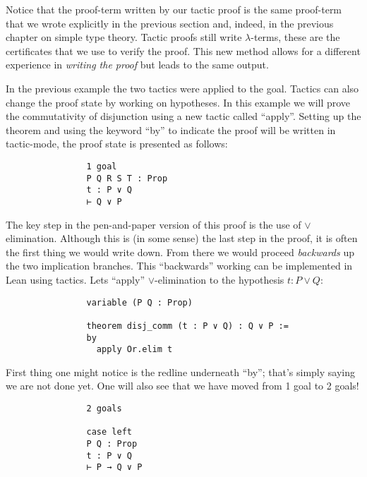 \documentclass{book}
\begin{document}
    Notice that the proof-term written by our tactic proof is the same proof-term that we wrote explicitly in the previous section and, indeed, in the previous chapter on simple type theory. Tactic proofs still write $\lambda$-terms, these are the certificates that we use to verify the proof. This new method allows for a different experience in \emph{writing the proof} but leads to the same output. 

    \newpage
    \begin{eg}
        In the previous example the two tactics were applied to the goal. Tactics can also change the proof state by working on hypotheses. In this example we will prove the commutativity of disjunction using a new tactic called ``apply''. Setting up the theorem and using the keyword ``by'' to indicate the proof will be written in tactic-mode, the proof state is presented as follows:
        \begin{center}
            \begin{lstlisting}
                1 goal
                P Q R S T : Prop
                t : P ∨ Q
                ⊢ Q ∨ P
            \end{lstlisting}            
        \end{center}
        The key step in the pen-and-paper version of this proof is the use of $\lor$ elimination. Although this is (in some sense) the last step in the proof, it is often the first thing we would write down. From there we would proceed \emph{backwards} up the two implication branches. This ``backwards'' working can be implemented in Lean using tactics. Lets ``apply'' $\lor$-elimination to the hypothesis $t : P \lor Q$: 
        \begin{center}
            \begin{lstlisting}
                variable (P Q : Prop)
                
                theorem disj_comm (t : P ∨ Q) : Q ∨ P :=
                by
                  apply Or.elim t
            \end{lstlisting}            
        \end{center}
        First thing one might notice is the redline underneath ``by''; that's simply saying we are not done yet. One will also see that we have moved from 1 goal to 2 goals!
        \begin{center}
            \begin{lstlisting}
                2 goals

                case left
                P Q : Prop
                t : P ∨ Q
                ⊢ P → Q ∨ P
                

\end{lstlisting}
\end{center}
\end{eg}
\end{document}
